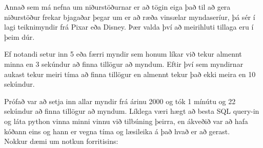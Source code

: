 \documentclass[12pt, git, draft]{rureport}
\begin{document}
Annað sem má nefna um niðurstöðurnar er að tögin eiga það til að gera niðurstöður frekar bjagaðar þegar um er að ræða vinsælar myndaseríur, þá sér í lagi teiknimyndir frá Pixar eða Disney. Þær valda því að meirihluti tillaga eru í þeim dúr.

Ef notandi setur inn 5 eða færri myndir sem honum líkar við tekur almennt minna en 3 sekúndur að finna tillögur að myndum. Eftir því sem myndirnar aukast tekur meiri tíma að finna tillögur en almennt tekur það ekki meira en 10 sekúndur.

Prófað var að setja inn allar myndir frá árinu 2000 og tók 1 mínútu og 22 sekúndur að finna tillögur að myndum. Líklega væri hægt að besta SQL query-in og láta python vinna minni vinnu við tilbúning þeirra, en ákveðið var að hafa kóðann eins og hann er vegna tíma og læsileika á það hvað er að gerast.
\\
Nokkur dæmi um notkun forritisins:
\end{document}
